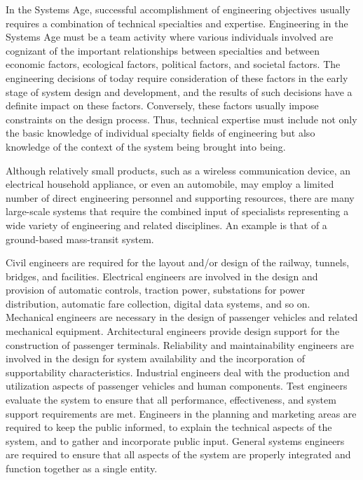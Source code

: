 In the Systems Age, successful accomplishment of engineering objectives usually requires a combination of technical specialties and expertise. Engineering in the Systems Age must be a team activity where various individuals involved are cognizant of the important relationships between specialties and between economic factors, ecological factors, political factors, and societal factors. The engineering decisions of today require consideration of these factors in the early stage of system design and development, and the results of such decisions have a definite impact on these factors. Conversely, these factors usually impose constraints on the design process. Thus, technical expertise must include not only the basic knowledge of individual specialty fields of engineering but also knowledge of the context of the system being brought into being.

Although relatively small products, such as a wireless communication device, an electrical household appliance, or even an automobile, may employ a limited number of direct engineering personnel and supporting resources, there are many large-scale systems that require the combined input of specialists representing a wide variety of engineering and related disciplines. An example is that of a ground-based mass-transit system.

Civil engineers are required for the layout and/or design of the railway, tunnels, bridges, and facilities. Electrical engineers are involved in the design and provision of automatic controls, traction power, substations for power distribution, automatic fare collection, digital data systems, and so on. Mechanical engineers are necessary in the design of passenger vehicles and related mechanical equipment. Architectural engineers provide design support for the construction of passenger terminals. Reliability and maintainability engineers are involved in the design for system availability and the incorporation of supportability characteristics. Industrial engineers deal with the production and utilization aspects of passenger vehicles and human components. Test engineers evaluate the system to ensure that all performance, effectiveness, and system support requirements are met. Engineers in the planning and marketing areas are required to keep the public informed, to explain the technical aspects of the system, and to gather and incorporate public input. General systems engineers are required to ensure that all aspects of the system are properly integrated and function together as a single entity.

